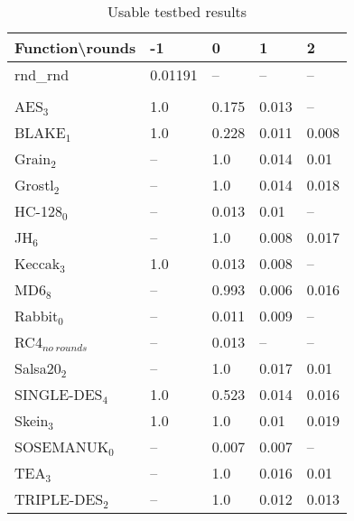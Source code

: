 \documentclass[twoside,a4paper]{article}
\begin{document}
\newcommand{\fd}{\cellcolor{red!13}}
\newcommand{\fn}{\cellcolor{green!13}}

\begin{table}[H]
\centering
\label{res_usable}
\begin{tabular}{l|l l l l}
Function\textbackslash{}rounds & -1 & 0 & 1 & 2\\ \hline
rnd\_rnd         & \fn{}0.01191 & --       & --         & --        \\\\
AES$_{3}$        & \fd{}1.0   & \fd{}0.175 & \fn{}0.013 & \fn{}--   \\
BLAKE$_{1}$      & \fd{}1.0   & \fd{}0.228 & \fn{}0.011 & \fn{}0.008\\
Grain$_{2}$      & \fd{}--    & \fd{}1.0   & \fn{}0.014 & \fn{}0.01 \\
Grostl$_{2}$     & \fd{}--    & \fd{}1.0   & \fn{}0.014 & \fn{}0.018\\
HC-128$_{0}$     & \fd{}--    & \fn{}0.013 & \fn{}0.01  & \fn{}--   \\
JH$_{6}$         & \fd{}--    & \fd{}1.0   & \fn{}0.008 & \fn{}0.017\\
Keccak$_{3}$     & \fd{}1.0   & \fn{}0.013 & \fn{}0.008 & \fn{}--   \\
MD6$_{8}$        & \fd{}--    & \fd{}0.993 & \fn{}0.006 & \fn{}0.016\\
Rabbit$_{0}$     & \fd{}--    & \fn{}0.011 & \fn{}0.009 & \fn{}--   \\
RC4$_{no~rounds}$& --         & \fn{}0.013 & --         & --        \\
Salsa20$_{2}$    & \fd{}--    & \fd{}1.0   & \fn{}0.017 & \fn{}0.01 \\
SINGLE-DES$_{4}$ & \fd{}1.0   & \fd{}0.523 & \fn{}0.014 & \fn{}0.016\\
Skein$_{3}$      & \fd{}1.0   & \fd{}1.0   & \fn{}0.01  & \fn{}0.019\\
SOSEMANUK$_{0}$  & \fd{}--    & \fn{}0.007 & \fn{}0.007 & \fn{}--   \\
TEA$_{3}$        & \fd{}--    & \fd{}1.0   & \fn{}0.016 & \fn{}0.01 \\
TRIPLE-DES$_{2}$ & \fd{}--    & \fd{}1.0   & \fn{}0.012 & \fn{}0.013
\end{tabular}
\caption{Usable testbed results}
\end{table}
\end{document}
